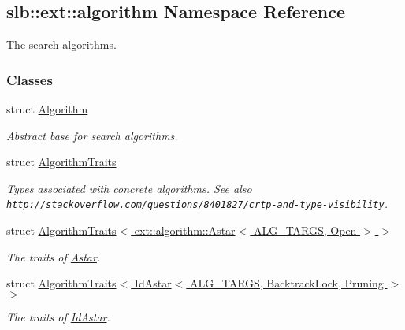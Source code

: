 \hypertarget{namespaceslb_1_1ext_1_1algorithm}{}\subsection{slb\+:\+:ext\+:\+:algorithm Namespace Reference}
\label{namespaceslb_1_1ext_1_1algorithm}


The search algorithms.  


\subsubsection*{Classes}
\begin{DoxyCompactItemize}
\item 
struct \hyperlink{structslb_1_1ext_1_1algorithm_1_1Algorithm}{Algorithm}
\begin{DoxyCompactList}\small\item\em Abstract base for search algorithms. \end{DoxyCompactList}\item 
struct \hyperlink{classslb_1_1ext_1_1algorithm_1_1AlgorithmTraits}{Algorithm\+Traits}
\begin{DoxyCompactList}\small\item\em Types associated with concrete algorithms. See also \href{http://stackoverflow.com/questions/8401827/crtp-and-type-visibility}{\tt http\+://stackoverflow.\+com/questions/8401827/crtp-\/and-\/type-\/visibility}. \end{DoxyCompactList}\item 
struct \hyperlink{structslb_1_1ext_1_1algorithm_1_1AlgorithmTraits_3_01ext_1_1algorithm_1_1Astar_3_01ALG__TARGS_00_01Open_01_4_01_4}{Algorithm\+Traits$<$ ext\+::algorithm\+::\+Astar$<$ A\+L\+G\+\_\+\+T\+A\+R\+G\+S, Open $>$ $>$}
\begin{DoxyCompactList}\small\item\em The traits of \hyperlink{structslb_1_1ext_1_1algorithm_1_1Astar}{Astar}. \end{DoxyCompactList}\item 
struct \hyperlink{structslb_1_1ext_1_1algorithm_1_1AlgorithmTraits_3_01IdAstar_3_01ALG__TARGS_00_01BacktrackLock_00_01Pruning_01_4_01_4}{Algorithm\+Traits$<$ Id\+Astar$<$ A\+L\+G\+\_\+\+T\+A\+R\+G\+S, Backtrack\+Lock, Pruning $>$ $>$}
\begin{DoxyCompactList}\small\item\em The traits of \hyperlink{structslb_1_1ext_1_1algorithm_1_1IdAstar}{Id\+Astar}. \end{DoxyCompactList}\item 

\end{DoxyCompactItemize}
